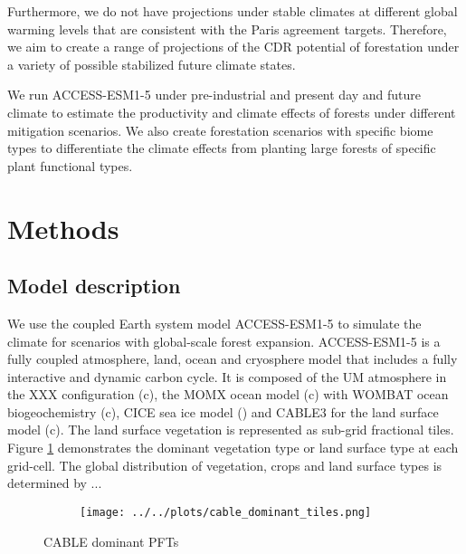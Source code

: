 \documentclass[]{article}
\begin{document}
Furthermore, we do not have projections under stable climates at different global warming levels that are consistent with the Paris agreement targets.
Therefore, we aim to create a range of projections of the CDR potential of forestation under a variety of possible stabilized future climate states.

We run ACCESS-ESM1-5 under pre-industrial and present day and future climate to estimate the productivity and climate effects of forests under different mitigation scenarios.
We also create forestation scenarios with specific biome types to differentiate the climate effects from planting large forests of specific plant functional types.

\section{Methods}

\subsection{Model description}

We use the coupled Earth system model ACCESS-ESM1-5 to simulate the climate for scenarios with global-scale forest expansion.
ACCESS-ESM1-5 is a fully coupled atmosphere, land, ocean and cryosphere model that includes a fully interactive and dynamic carbon cycle.
It is composed of the UM atmosphere in the XXX configuration (c), the MOMX ocean model (c) with WOMBAT ocean biogeochemistry (c), CICE sea ice model () and CABLE3 for the land surface model (c).
The land surface vegetation is represented as sub-grid fractional tiles.
Figure \ref{fig:dominant_pfts} demonstrates the dominant vegetation type or land surface type at each grid-cell.
The global distribution of vegetation, crops and land surface types is determined by ...


\begin{figure}[H]
    \begin{subfigure}[b]{\linewidth}
        \centering
        \texttt{[image: ../../plots/cable\_dominant\_tiles.png]}
    \end{subfigure}
    \caption{CABLE dominant PFTs}
    \label{fig:dominant_pfts}
\end{figure}
\end{document}
